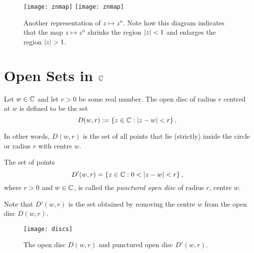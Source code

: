 \begin{figure}[h]
\centering
{
\texttt{[image: znmap]}
}
{
\texttt{[image: znmap]}
}
\caption{Another representation of $z \mapsto z^n$.  Note how this diagram indicates that the map $z \mapsto z^n$ shrinks the region $\left| z \right|<1$ and enlarges the region $\abs{z}>1$.}
\label{f:zn}
\end{figure}



\section{Open Sets in $\mathbb{C}$}




\begin{definition}
Let $w \in \mathbb{C}$ and let $r>0$ be some real number.  The open disc of radius $r$ centred at $w$ is defined to be the set 
\[
D(w,r):= \left\{ z \in \mathbb{C}: \left| z-w \right| <r\right\}.
\]
\end{definition}
In other words, $D(w,r)$ is the set of all points that lie (strictly) inside the circle or radius $r$ with centre $w$.
\begin{definition}
The set of points
\[
D'(w,r) = \left\{ z \in \mathbb{C}: 0 < \left| z-w \right| < r\right\},
\]
where $r>0$ and $w \in \mathbb{C}$, is called the \emph{punctured open disc} of radius $r$, centre $w$.
\end{definition}


Note that $D'(w,r)$ is the set obtained by removing the centre $w$ from the open disc $D(w,r)$.
\begin{figure}[h]
\centering
\texttt{[image: discs]}
\caption{The open disc $D(w,r)$ and punctured open disc $D'(w,r)$.}
\label{f:discs}
\end{figure}



